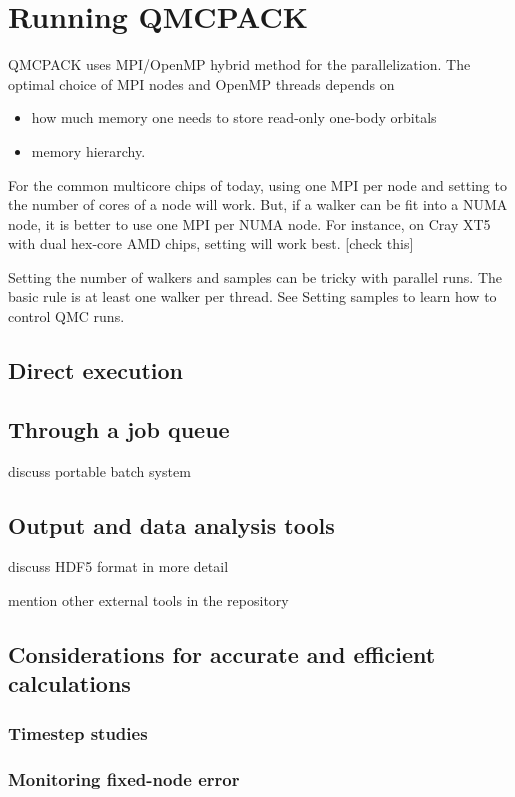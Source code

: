 \chapter{Running QMCPACK}
QMCPACK uses MPI/OpenMP hybrid method for the parallelization. The optimal choice of MPI nodes and OpenMP threads depends on
\begin{itemize}
\item{} how much memory one needs to store read-only one-body orbitals
\item{} memory hierarchy.
\end{itemize}

For the common multicore chips of today, using one MPI per node and setting  to the number of cores of a node will work. But, if a walker can be fit into a NUMA node, it is better to use one MPI per NUMA node. For instance, on Cray XT5 with dual hex-core AMD chips, setting  will work best. [check this]

Setting the number of walkers and samples can be tricky with parallel runs. The basic rule is at least one walker per thread.  See Setting samples to learn how to control QMC runs.

\section{Direct execution}
\section{Through a job queue}

discuss portable batch system
\section{Output and data analysis tools}
discuss HDF5 format in more detail

mention other external tools in the repository
\section{Considerations for accurate and efficient calculations}
\subsection{Timestep studies}
\subsection{Monitoring fixed-node error}
